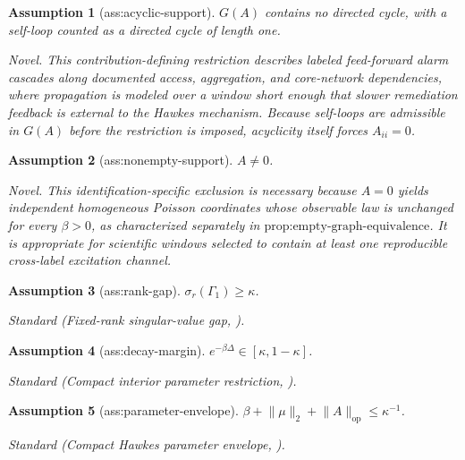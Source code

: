 \documentclass{article}
\newtheorem{assumption}{Assumption}
\begin{document}
\begin{assumption}[ass:acyclic-support]\label{ass:acyclic-support}
\(G(A)\) contains no directed cycle, with a self-loop counted as a directed cycle of length one.
\par\smallskip\noindent\emph{Novel.} This contribution-defining restriction describes labeled feed-forward alarm cascades along documented access, aggregation, and core-network dependencies, where propagation is modeled over a window short enough that slower remediation feedback is external to the Hawkes mechanism. Because self-loops are admissible in \(G(A)\) before the restriction is imposed, acyclicity itself forces \(A_{ii}=0\).
\end{assumption}

\begin{assumption}[ass:nonempty-support]\label{ass:nonempty-support}
\(A\neq0\).
\par\smallskip\noindent\emph{Novel.} This identification-specific exclusion is necessary because \(A=0\) yields independent homogeneous Poisson coordinates whose observable law is unchanged for every \(\beta>0\), as characterized separately in \(\text{prop:empty-graph-equivalence}\). It is appropriate for scientific windows selected to contain at least one reproducible cross-label excitation channel.
\end{assumption}

\begin{assumption}[ass:rank-gap]\label{ass:rank-gap}
\(\sigma_r(\Gamma_1)\geq\kappa\).
\par\smallskip\noindent\emph{Standard} (Fixed-rank singular-value gap, \cite{KoltchinskiiLounici2016Projectors}).
\end{assumption}

\begin{assumption}[ass:decay-margin]\label{ass:decay-margin}
\(e^{-\beta\Delta}\in[\kappa,1-\kappa]\).
\par\smallskip\noindent\emph{Standard} (Compact interior parameter restriction, \cite{CheyssonLang2022}).
\end{assumption}

\begin{assumption}[ass:parameter-envelope]\label{ass:parameter-envelope}
\(\beta+\lVert\mu\rVert_2+\lVert A\rVert_{\mathrm{op}}\leq\kappa^{-1}\).
\par\smallskip\noindent\emph{Standard} (Compact Hawkes parameter envelope, \cite{CheyssonLang2022}).
\end{assumption}
\end{document}
